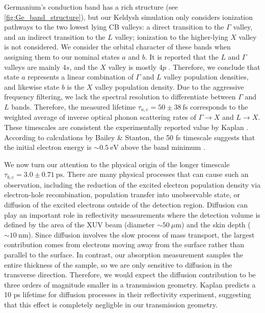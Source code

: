 Germanium's conduction band has a rich structure (see \cref{fig:Ge_band_structure}), but our Keldysh simulation only considers ionization pathways to the two lowest lying CB valleys: a direct transition to the $\Gamma$ valley, and an indirect transition to the $L$ valley; ionization to the higher-lying $X$ valley is not considered. We consider the orbital character of these bands when assigning them to our nominal states $a$ and $b$. It is reported that the $L$ and $\Gamma$ valleys are mainly $4s$, and the $X$ valley is mostly $4p$ \cite{zurchDirectSimultaneousObservation2017,kaplanFemtosecondTrackingCarrier2018}. Therefore, we conclude that state $a$ represents a linear combination of $\Gamma$ and $L$ valley population densities, and likewise state $b$ is the $X$ valley population density. Due to the aggressive frequency filtering, we lack the spectral resolution to differentiate between $\Gamma$ and $L$ bands. Therefore, the measured lifetime $\tau_{a,e} = 50 \pm 38 \ \textrm{fs}$ corresponds to the weighted average of inverse optical phonon scattering rates of $\Gamma \rightarrow X$ and $L \rightarrow X$. These timescales are consistent the experimentally reported value by Kaplan \cite{kaplanFemtosecondTrackingCarrier2018}. According to calculations by Bailey \& Stanton, the 50 fs timescale suggests that the initial electron energy is $\sim 0.5 \ \textrm{eV}$ above the band minimum  \cite{baileyCalculationsFemtosecondDifferential1995}.

We now turn our attention to the physical origin of the longer timescale $\tau_{b,e} = 3.0 \pm 0.71 \ \textrm{ps}$. There are many physical processes that can cause such an observation, including the reduction of the excited electron population density via electron-hole recombination, population transfer into unobservable state, or diffusion of the excited electrons outside of the detection region. Diffusion can play an important role in reflectivity measurements where the detection volume is defined by the area of the XUV beam (diameter $\sim 50 \ \mu\textrm{m}$) and the skin depth ($\sim 10 \ \textrm{nm}$). Since diffusion involves the slow process of mass transport, the largest contribution comes from electrons moving away from the surface rather than parallel to the surface. In contrast, our absorption measurement samples the entire thickness of the sample, so we are only sensitive to diffusion in the transverse direction. Therefore, we would expect the diffusion contribution to be three orders of magnitude smaller in a transmission geometry. Kaplan predicts a 10 ps lifetime for diffusion processes in their reflectivity experiment, suggesting that this effect is completely negligble in our transmission geometry.

